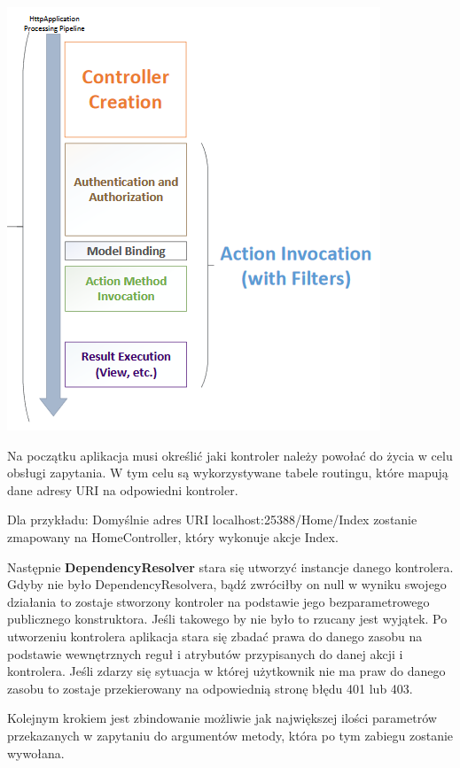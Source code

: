 \begin{center}
	\includegraphics{images/ControllerLifecycle.png}
\end{center}

Na początku aplikacja musi określić jaki kontroler należy powołać do życia w celu obsługi zapytania. W tym celu są wykorzystywane tabele routingu, które mapują dane adresy URI na odpowiedni kontroler. 

Dla przykładu: Domyślnie adres URI localhost:25388/Home/Index zostanie zmapowany na HomeController, który wykonuje akcje Index.

Następnie \textbf{DependencyResolver} stara się utworzyć instancje danego kontrolera. Gdyby nie było DependencyResolvera, bądź zwróciłby on null w wyniku swojego działania to zostaje stworzony kontroler na podstawie jego bezparametrowego publicznego konstruktora. Jeśli takowego by nie było to rzucany jest wyjątek. Po utworzeniu kontrolera aplikacja stara się zbadać prawa do danego zasobu na podstawie wewnętrznych reguł i atrybutów przypisanych do danej akcji i kontrolera. Jeśli zdarzy się sytuacja w której użytkownik nie ma praw do danego zasobu to zostaje przekierowany na odpowiednią stronę błędu 401 lub 403.

Kolejnym krokiem jest zbindowanie możliwie jak największej ilości parametrów przekazanych w zapytaniu do argumentów metody, która po tym zabiegu zostanie wywołana.

